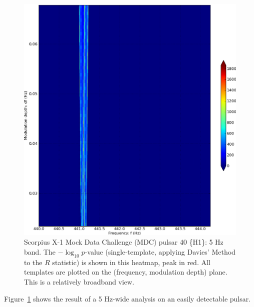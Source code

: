 \documentclass[12pt]{iopart}
\begin{document}
\begin{figure}
\begin{center}
\includegraphics[width=0.65\paperwidth,height=0.5\paperheight]{plots/bandH1-bold.eps}
\caption{
Scorpius X-1 Mock Data Challenge (MDC) pulsar 40 \{H1\}: 5 Hz band. 
The $-\log_{10}p$-value (single-template, applying Davies' Method to the $R$ statistic) is shown in this heatmap, peak in red. 
All templates are plotted on the (frequency, modulation depth) plane.
This is a relatively broadband view.
}
\label{scox1-wide-heatmap-040}
\end{center}
\end{figure}


Figure~\ref{scox1-wide-heatmap-040} shows the result of a 5 Hz-wide analysis on an easily detectable pulsar.
\end{document}

